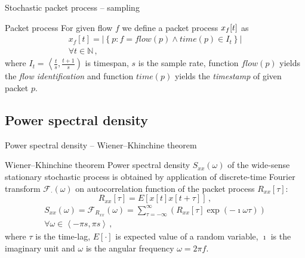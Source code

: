 \documentclass{beamer}
\begin{document}
\begin{frame}{Stochastic packet process -- sampling}
\begin{block}{Packet process}
For given flow $f$ we define a packet process $x_f{\left[{ t }\right]}$ as
\begin{equation}\label{packetprocess}
\begin{split}
	 x_f\left[t\right] = \left| 
	\left\lbrace p : f = flow(p) \wedge time(p) \in I_t \right\rbrace \right|\\
	\forall t \in \mathbb{N}\, ,
\end{split}
\end{equation}
where $I_t = \left\langle \frac{t}{s}, \frac{t+1}{s} \right)$  is timespan,
$s$ is the sample rate, function $flow(p)$  yields the \emph{flow identification}
and function $time(p)$  yields the \emph{timestamp} of given packet $p$. 
\end{block}
\end{frame}

\subsection{Power spectral density}
\begin{frame}{Power spectral density -- Wiener–Khinchine theorem}
\begin{block}{Wiener–Khinchine theorem}
Power spectral density $S_{xx}(\omega)$ of the wide-sense stationary 
stochastic process is obtained by application of discrete-time 
Fourier transform $\mathcal{F}_{\cdot}(\omega)$ on autocorrelation function 
of the packet process $R_{xx}\left[\tau\right]$:
\begin{equation}\label{eq:corr}
R_{xx}\left[\tau\right] = E[x\left[t\right]x\left[t+\tau\right]]\, , 
\end{equation}
\begin{equation}\label{eq:psd}
\begin{split}
S_{xx}(\omega) = \mathcal{F}_{R_{xx}}\left(\omega\right) = \sum_{\tau=-\infty}^{\infty} 
\left( R_{xx}\left[\tau\right] \exp\left( -\imath \omega\tau \right)\right) \\ 
\forall \omega \in \left\langle -\pi s,\pi s \right\rangle\, , 
\end{split}
\end{equation}
where $\tau$ is the time-lag, $E\left[\cdot\right]$ is expected value of a random variable, $\imath$
is the imaginary unit and $\omega$ is the angular frequency $\omega= 2\pi f$. 
\end{block}
\end{frame}
\end{document}
